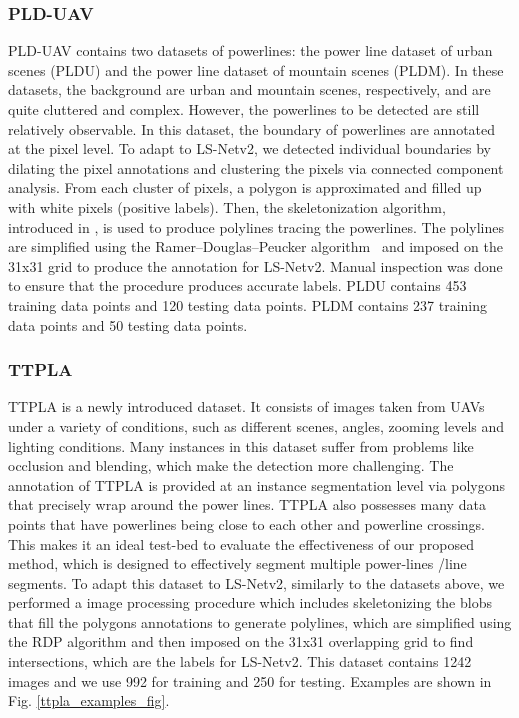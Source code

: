 \documentclass[journal]{IEEEtran}
\begin{document}
\subsubsection{PLD-UAV}

PLD-UAV \cite{PLD_UAV} contains two datasets of powerlines: the power line dataset of urban scenes (PLDU) and the power line dataset of mountain scenes (PLDM). In these datasets, the background are urban and mountain scenes, respectively, and are quite cluttered and complex. However, the powerlines to be detected are still relatively observable. In this dataset, the boundary of powerlines are annotated at the pixel level. To adapt to LS-Netv2, we detected individual boundaries by dilating the pixel annotations and clustering the pixels via connected component analysis. From each cluster of pixels, a polygon is approximated and filled up with white pixels (positive labels). Then, the skeletonization algorithm, introduced in \cite{skeleton}, is used to produce polylines tracing the powerlines. The polylines are simplified using the Ramer–Douglas–Peucker algorithm~\cite{RDP} and imposed on the 31x31 grid to produce the annotation for LS-Netv2. Manual inspection was done to ensure that the procedure produces accurate labels. PLDU contains 453 training data points and 120 testing data points. PLDM contains 237 training data points and 50 testing data points.

\subsubsection{TTPLA}

TTPLA \cite{TTPLA} is a newly introduced dataset. It consists of images taken from UAVs under a variety of conditions, such as different scenes, angles, zooming levels and lighting conditions. Many instances in this dataset suffer from problems like occlusion and blending, which make the detection more challenging. The annotation of TTPLA is provided at an instance segmentation level via polygons that precisely wrap around the power lines. TTPLA also possesses many data points that have powerlines being close to each other and powerline crossings. This makes it an ideal test-bed to evaluate the effectiveness of our proposed method, which is designed to effectively segment multiple power-lines /line segments. To adapt this dataset to LS-Netv2, similarly to the datasets above, we performed a image processing procedure which includes skeletonizing the blobs that fill the polygons annotations to generate polylines, which are simplified using the RDP algorithm and then imposed on the 31x31 overlapping grid to find intersections, which are the labels for LS-Netv2. This dataset contains 1242 images and we use 992 for training and 250 for testing. Examples are shown in Fig. \ref{ttpla_examples_fig}.
\end{document}
